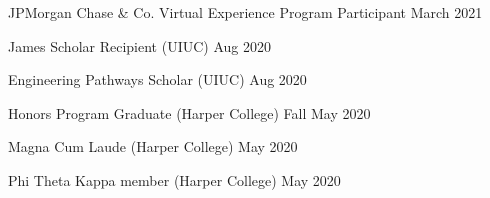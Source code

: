 JPMorgan Chase \& Co. Virtual Experience Program Participant	\hfill March 2021

James Scholar Recipient (UIUC)	\hfill Aug 2020

Engineering Pathways Scholar (UIUC)	\hfill Aug 2020

Honors Program Graduate (Harper College)	\hfill Fall May 2020

Magna Cum Laude (Harper College)	\hfill May 2020

Phi Theta Kappa member (Harper College)	\hfill May 2020



